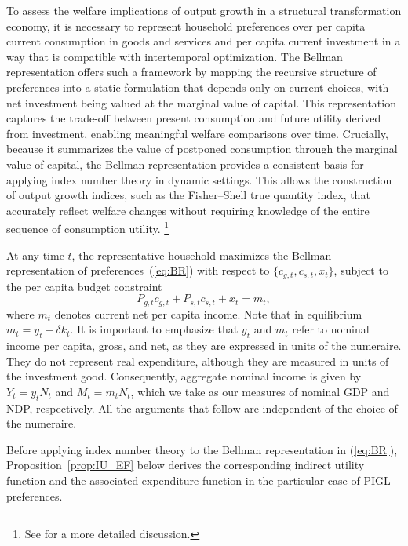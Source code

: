 \documentclass[12pt,a4paper]{article}
\newcommand{\red}[1]{\textcolor{red}{#1}} %
\begin{document}
To assess the welfare implications of output growth in a structural transformation economy, it is necessary to represent household preferences over per capita current consumption in goods and services and per capita current investment in a way that is compatible with intertemporal optimization.  
The Bellman representation offers such a framework by mapping the recursive structure of preferences into a static formulation that depends only on current choices, with net investment being valued at the marginal value of capital. 
This representation captures the trade-off between present consumption and future utility derived from investment, enabling meaningful welfare comparisons over time.  
Crucially, because it summarizes the value of postponed consumption through the marginal value of capital, the Bellman representation provides a consistent basis for applying index number theory in dynamic settings.  
This allows the construction of output growth indices, such as the Fisher–Shell true quantity index, that accurately reflect welfare changes without requiring knowledge of the entire sequence of consumption utility.%
\footnote{See  \cite{duran_licandro_2024} for a more detailed discussion.}

At any time $t$, the representative household maximizes the Bellman representation of preferences~(\ref{eq:BR}) with respect to \( \{c_{g,t}, c_{s,t}, x_t\} \), subject to the per capita budget constraint
\begin{equation}\label{eq:BC}
P_{g,t} c_{g,t} + P_{s,t} c_{s,t} + x_t = m_t,
\end{equation}
where \( m_t  \) denotes current net per capita income. Note that 
in equilibrium \( m_t = y_t - \delta k_t \).
It is important to emphasize that \( y_t \) and \( m_t \) refer to nominal income per capita, gross, and net, as they are expressed in units of the numeraire. They do not represent real expenditure, although they are measured in units of the investment good.
Consequently, aggregate nominal income is given by \( Y_t = y_t N_t \) and \( M_t = m_t N_t \), which we take as our measures of nominal GDP and NDP, respectively. All the arguments that follow are independent of the choice of the numeraire.

Before applying index number theory to the Bellman representation in (\ref{eq:BR}), Proposition~\ref{prop:IU_EF} below derives the corresponding indirect utility function and the associated expenditure function %
in the particular case of PIGL preferences. 
\end{document}
